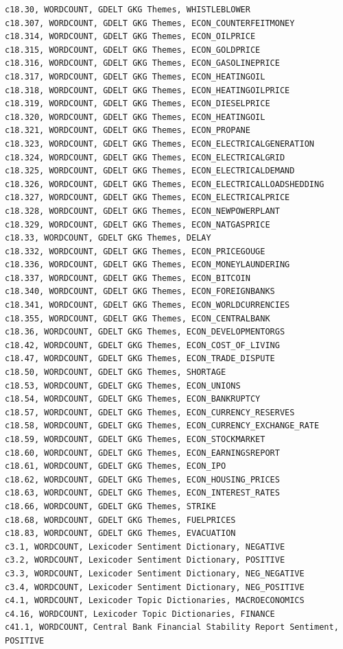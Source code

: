 \documentclass[12pt]{article}
\begin{document}
\begin{verbatim}
c18.30, WORDCOUNT, GDELT GKG Themes, WHISTLEBLOWER
c18.307, WORDCOUNT, GDELT GKG Themes, ECON_COUNTERFEITMONEY
c18.314, WORDCOUNT, GDELT GKG Themes, ECON_OILPRICE
c18.315, WORDCOUNT, GDELT GKG Themes, ECON_GOLDPRICE
c18.316, WORDCOUNT, GDELT GKG Themes, ECON_GASOLINEPRICE
c18.317, WORDCOUNT, GDELT GKG Themes, ECON_HEATINGOIL
c18.318, WORDCOUNT, GDELT GKG Themes, ECON_HEATINGOILPRICE
c18.319, WORDCOUNT, GDELT GKG Themes, ECON_DIESELPRICE
c18.320, WORDCOUNT, GDELT GKG Themes, ECON_HEATINGOIL
c18.321, WORDCOUNT, GDELT GKG Themes, ECON_PROPANE
c18.323, WORDCOUNT, GDELT GKG Themes, ECON_ELECTRICALGENERATION
c18.324, WORDCOUNT, GDELT GKG Themes, ECON_ELECTRICALGRID
c18.325, WORDCOUNT, GDELT GKG Themes, ECON_ELECTRICALDEMAND
c18.326, WORDCOUNT, GDELT GKG Themes, ECON_ELECTRICALLOADSHEDDING
c18.327, WORDCOUNT, GDELT GKG Themes, ECON_ELECTRICALPRICE
c18.328, WORDCOUNT, GDELT GKG Themes, ECON_NEWPOWERPLANT
c18.329, WORDCOUNT, GDELT GKG Themes, ECON_NATGASPRICE
c18.33, WORDCOUNT, GDELT GKG Themes, DELAY
c18.332, WORDCOUNT, GDELT GKG Themes, ECON_PRICEGOUGE
c18.336, WORDCOUNT, GDELT GKG Themes, ECON_MONEYLAUNDERING
c18.337, WORDCOUNT, GDELT GKG Themes, ECON_BITCOIN
c18.340, WORDCOUNT, GDELT GKG Themes, ECON_FOREIGNBANKS
c18.341, WORDCOUNT, GDELT GKG Themes, ECON_WORLDCURRENCIES
c18.355, WORDCOUNT, GDELT GKG Themes, ECON_CENTRALBANK
c18.36, WORDCOUNT, GDELT GKG Themes, ECON_DEVELOPMENTORGS
c18.42, WORDCOUNT, GDELT GKG Themes, ECON_COST_OF_LIVING
c18.47, WORDCOUNT, GDELT GKG Themes, ECON_TRADE_DISPUTE
c18.50, WORDCOUNT, GDELT GKG Themes, SHORTAGE
c18.53, WORDCOUNT, GDELT GKG Themes, ECON_UNIONS
c18.54, WORDCOUNT, GDELT GKG Themes, ECON_BANKRUPTCY
c18.57, WORDCOUNT, GDELT GKG Themes, ECON_CURRENCY_RESERVES
c18.58, WORDCOUNT, GDELT GKG Themes, ECON_CURRENCY_EXCHANGE_RATE
c18.59, WORDCOUNT, GDELT GKG Themes, ECON_STOCKMARKET
c18.60, WORDCOUNT, GDELT GKG Themes, ECON_EARNINGSREPORT
c18.61, WORDCOUNT, GDELT GKG Themes, ECON_IPO
c18.62, WORDCOUNT, GDELT GKG Themes, ECON_HOUSING_PRICES
c18.63, WORDCOUNT, GDELT GKG Themes, ECON_INTEREST_RATES
c18.66, WORDCOUNT, GDELT GKG Themes, STRIKE
c18.68, WORDCOUNT, GDELT GKG Themes, FUELPRICES
c18.83, WORDCOUNT, GDELT GKG Themes, EVACUATION
c3.1, WORDCOUNT, Lexicoder Sentiment Dictionary, NEGATIVE
c3.2, WORDCOUNT, Lexicoder Sentiment Dictionary, POSITIVE
c3.3, WORDCOUNT, Lexicoder Sentiment Dictionary, NEG_NEGATIVE
c3.4, WORDCOUNT, Lexicoder Sentiment Dictionary, NEG_POSITIVE
c4.1, WORDCOUNT, Lexicoder Topic Dictionaries, MACROECONOMICS
c4.16, WORDCOUNT, Lexicoder Topic Dictionaries, FINANCE
c41.1, WORDCOUNT, Central Bank Financial Stability Report Sentiment, POSITIVE

\end{verbatim}
\end{document}

